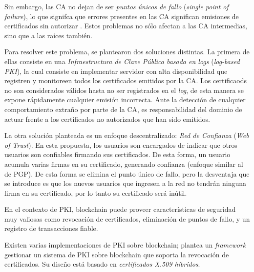 Sin embargo, las CA no dejan de ser \emph{puntos únicos de fallo} (\emph{single point of failure}), lo que signifca que errores presentes en las CA significan emisiones de certificados sin autorizar \autocite{PKICAErrors}. Estos problemas no sólo afectan a las CA intermedias, sino que a las raíces también.

Para resolver este problema, se plantearon dos soluciones distintas. La primera de ellas consiste en una \emph{Infraestructura de Clave Pública basada en logs} (\emph{log-based PKI}), la cual consiste en implementar servidor con alta disponibilidad que registren y monitoreen todos los certificados emitidos por la CA. Los certificaods no son considerados válidos hasta no ser registrados en el \emph{log}, de esta manera se expone rápidamente cualquier emisión incorrecta. Ante la detección de cualquier comportamiento extraño por parte de la CA, es responsabilidad del dominio de actuar frente a los certificados no autorizados que han sido emitidos.

La otra solución planteada es un enfoque descentralizado: \emph{Red de Confianza} (\emph{Web of Trust}). En esta propuesta, los usuarios son encargados de indicar que otros usuarios son confiables firmando sus certificados. De esta forma, un usuario acumula varias firmas en su certificado, generando confianza (enfoque similar al de PGP). De esta forma se elimina el punto único de fallo, pero la desventaja que se introduce es que los nuevos usuarios que ingresen a la red no tendrán ninguna firma en su certificado, por lo tanto su certificado será inútil.

En el contexto de PKI, blockchain puede proveer características de seguridad muy valiosas como revocación de certificados, eliminación de puntos de fallo, y un registro de transacciones fiable.

Existen varias implementaciones de PKI sobre blockchain; \autocite{BlockchainBasedPKIFramework} plantea un \emph{framework} gestionar un sistema de PKI sobre blockchain que soporta la revocación de certificados. Su diseño está basado en \emph{certificados X.509 híbridos}.

